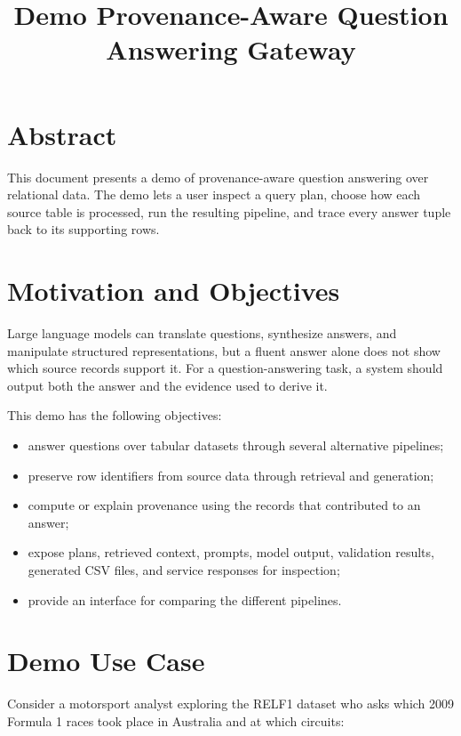 \documentclass[11pt,a4paper]{article}
\title{Demo Provenance-Aware Question Answering Gateway}
\author{}
\date{}
\begin{document}
\sloppy
\maketitle
\tableofcontents
\newpage

\section*{Abstract}

This document presents a demo of provenance-aware question answering over
relational data. The demo lets a user inspect a query plan, choose how each
source table is processed, run the resulting pipeline, and trace every answer
tuple back to its supporting rows.

\section{Motivation and Objectives}

Large language models can translate questions, synthesize answers, and manipulate
structured representations, but a fluent answer alone does not show which source
records support it. For a question-answering task, a system
should output both the answer and the evidence used to derive it.

This demo has the following objectives:

\begin{itemize}
  \item answer questions over tabular datasets through several alternative pipelines;
  \item preserve row identifiers from source data through retrieval and generation;
  \item compute or explain provenance using the records that contributed to an answer;
  \item expose plans, retrieved context, prompts, model output, validation results,
        generated CSV files, and service responses for inspection;
  \item provide an interface for comparing the different pipelines.
\end{itemize}

\section{Demo Use Case}

Consider a motorsport analyst exploring the RELF1 dataset who asks which 2009
Formula 1 races took place in Australia and at which circuits:
\end{document}
